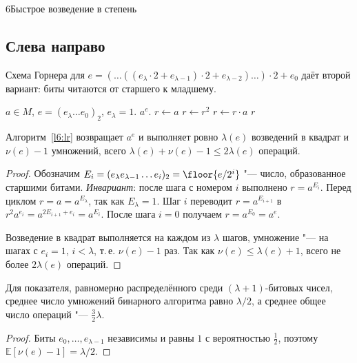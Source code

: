 \begin{lecture}{6}{Быстрое возведение в степень}
\subsection{Слева направо}

Схема Горнера для $e = (\dots((e_\lambda \cdot 2 + e_{\lambda-1}) \cdot 2 + e_{\lambda-2})\dots)\cdot 2 + e_0$
даёт второй вариант: биты читаются от старшего к младшему.

\begin{algorithm}\label{l6:lr}
\begin{algorithmic}[1]
\Require $a \in M$, $e = (e_\lambda \dots e_0)_2$, $e_\lambda = 1$.
\Ensure $a^e$.
\State $r \gets a$
  \State $r \gets r^2$
   $r \gets r \cdot a$ \EndIf
\EndFor
\State \Return $r$
\end{algorithmic}
\end{algorithm}

\begin{theorem}\label{l6:lr-correct}
Алгоритм~\ref{l6:lr} возвращает $a^e$ и выполняет ровно $\lambda(e)$ возведений в квадрат
и $\nu(e) - 1$ умножений, всего $\lambda(e) + \nu(e) - 1 \le 2\lambda(e)$ операций.
\end{theorem}

\begin{proof}
Обозначим $E_i = (e_\lambda e_{\lambda-1} \dots e_i)_2 = \floor{e / 2^i}$ "--- число, образованное
старшими битами. \emph{Инвариант}: после шага с номером $i$ выполнено $r = a^{E_i}$. Перед циклом
$r = a = a^{E_\lambda}$, так как $E_\lambda = 1$. Шаг $i$ переводит $r = a^{E_{i+1}}$ в
$r^2 a^{e_i} = a^{2E_{i+1} + e_i} = a^{E_i}$. После шага $i = 0$ получаем $r = a^{E_0} = a^e$.

Возведение в квадрат выполняется на каждом из $\lambda$ шагов, умножение "--- на шагах с $e_i = 1$,
$i < \lambda$, т.\,е. $\nu(e) - 1$ раз. Так как $\nu(e) \le \lambda(e) + 1$, всего
не более $2\lambda(e)$ операций.
\end{proof}

\begin{corollary}\label{l6:average}
Для показателя, равномерно распределённого среди $(\lambda + 1)$-битовых чисел, среднее число
умножений бинарного алгоритма равно $\lambda/2$, а среднее общее число операций "--- $\frac32\lambda$.
\end{corollary}

\begin{proof}
Биты $e_0, \dots, e_{\lambda-1}$ независимы и равны $1$ с вероятностью $\frac12$, поэтому
$\mathbb{E}[\nu(e) - 1] = \lambda/2$.
\end{proof}


\end{lecture}
